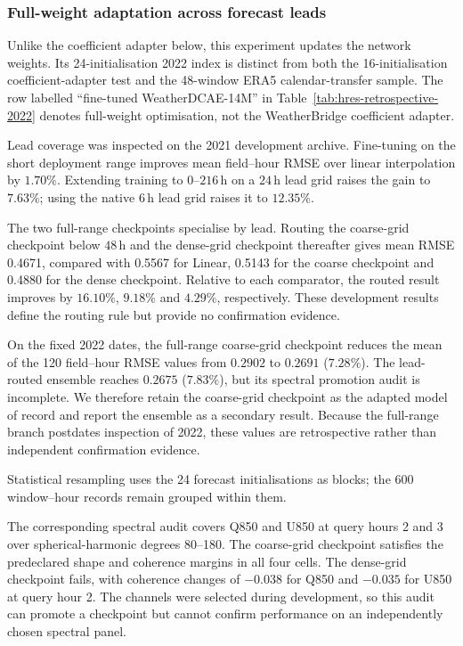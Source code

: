 \subsubsection{Full-weight adaptation across forecast leads}
\label{sec:hres_finetuning}

Unlike the coefficient adapter below, this experiment updates the network
weights. Its 24-initialisation 2022 index is distinct from both the
16-initialisation coefficient-adapter test and the 48-window ERA5
calendar-transfer sample. The row labelled ``fine-tuned WeatherDCAE-14M'' in
Table~\ref{tab:hres-retrospective-2022} denotes full-weight optimisation, not
the WeatherBridge coefficient adapter.

Lead coverage was inspected on the 2021 development archive. Fine-tuning on
the short deployment range improves mean field--hour RMSE over linear
interpolation by $1.70\%$. Extending training to $0$--$216\,$h on a $24\,$h
lead grid raises the gain to $7.63\%$; using the native $6\,$h lead grid raises
it to $12.35\%$.

The two full-range checkpoints specialise by lead. Routing the coarse-grid
checkpoint below $48\,$h and the dense-grid checkpoint thereafter gives mean
RMSE 0.4671, compared with 0.5567 for Linear, 0.5143 for the coarse checkpoint
and 0.4880 for the dense checkpoint. Relative to each comparator, the routed
result improves by $16.10\%$, $9.18\%$ and $4.29\%$, respectively. These
development results define the routing rule but provide no confirmation
evidence.

On the fixed 2022 dates, the full-range coarse-grid checkpoint reduces
the mean of the 120 field--hour RMSE values from $0.2902$ to $0.2691$
($7.28\%$). The lead-routed ensemble reaches $0.2675$ ($7.83\%$), but its
spectral promotion audit is incomplete. We therefore retain the coarse-grid
checkpoint as the adapted model of record and report the ensemble as a
secondary result. Because the full-range branch postdates inspection of 2022,
these values are retrospective rather than independent confirmation evidence.

Statistical resampling uses the 24 forecast initialisations as blocks; the 600
window--hour records remain grouped within them.



The corresponding spectral audit covers Q850 and U850 at query hours 2 and 3
over spherical-harmonic degrees 80--180. The coarse-grid checkpoint satisfies
the predeclared shape and coherence margins in all four cells. The dense-grid
checkpoint fails, with coherence changes of $-0.038$ for Q850 and $-0.035$ for
U850 at query hour 2. The channels were selected during development, so this
audit can promote a checkpoint but cannot confirm performance on an
independently chosen spectral panel.

